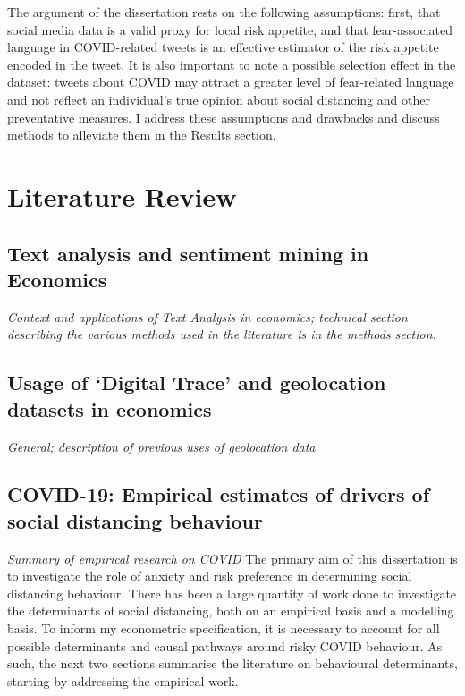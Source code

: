 \documentclass{article}
\begin{document}
The argument of the dissertation rests on the following assumptions: first, that social media data is a valid proxy for local risk appetite, and that fear-associated language in COVID-related tweets is an effective estimator of the risk appetite encoded in the tweet. It is also important to note a possible selection effect in the dataset: tweets about COVID may attract a greater level of fear-related language and not reflect an individual's true opinion about social distancing and other preventative measures. I address these assumptions and drawbacks and discuss methods to alleviate them in the Results section.


\section{Literature Review}%
\subsection{Text analysis and sentiment mining in Economics}
\textit{Context and applications of Text Analysis in economics; technical section describing the various methods used in the literature is in the methods section.}
\subsection{Usage of `Digital Trace' and geolocation datasets in economics}
\textit{General; description of previous uses of geolocation data}
\subsection{COVID-19: Empirical estimates of drivers of social distancing behaviour}
\textit{Summary of empirical research on COVID}
The primary aim of this dissertation is to investigate the role of anxiety and risk preference in determining social distancing behaviour. There has been a large quantity of work done to investigate the determinants of social distancing, both on an empirical basis and a modelling basis. To inform my econometric specification, it is necessary to account for all possible determinants and causal pathways around risky COVID behaviour. As such, the next two sections summarise the literature on behavioural determinants, starting by addressing the empirical work.
\end{document}
